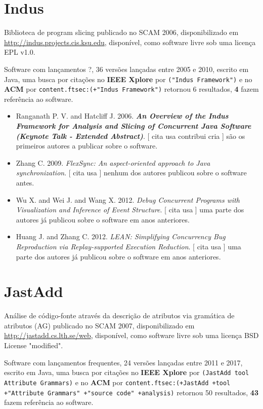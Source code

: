 \section{Indus}

Biblioteca de program slicing
publicado no SCAM 2006,
disponibilizado em \url{http://indus.projects.cis.ksu.edu},
disponível,
como software livre
sob uma licença EPL v1.0.

Software com lançamentos ?,
36 versões lançadas
entre 2005 e 2010,
escrito em Java,
uma busca por citações no {\bf IEEE Xplore} por
\texttt{("Indus Framework")}
e no {\bf ACM} por
\texttt{content.ftsec:(+"Indus Framework")}
retornou
6 resultados,
{\bf 4} fazem referência ao software.

\begin{itemize}
\item Ranganath P. V. and Hatcliff J.
      2006.
        \textbf{\textit{ An Overview of the Indus Framework for Analysis and Slicing of Concurrent Java Software (Keynote Talk - Extended Abstract)}}.
      [
          cita
          usa
          contribui
          cria
      ]
são os primeiros autores a publicar sobre o software.
\item Zhang C.
      2009.
        \textit{ FlexSync: An aspect-oriented approach to Java synchronization}.
      [
          cita
          usa
      ]
nenhum dos autores publicou sobre o software antes.
\item Wu X. and Wei J. and Wang X.
      2012.
        \textit{ Debug Concurrent Programs with Visualization and Inference of Event Structure}.
      [
          cita
          usa
      ]
uma parte dos autores já publicou sobre o software em anos anteriores.
\item Huang J. and Zhang C.
      2012.
        \textit{ LEAN: Simplifying Concurrency Bug Reproduction via Replay-supported Execution Reduction}.
      [
          cita
          usa
      ]
uma parte dos autores já publicou sobre o software em anos anteriores.
\end{itemize}
\section{JastAdd}

Análise de código-fonte através da descrição de atributos via gramática de atributos (AG)
publicado no SCAM 2007,
disponibilizado em \url{http://jastadd.cs.lth.se/web},
disponível,
como software livre
sob uma licença BSD License "modified".

Software com lançamentos frequentes,
24 versões lançadas
entre 2011 e 2017,
escrito em Java,
uma busca por citações no {\bf IEEE Xplore} por
\texttt{(JastAdd tool Attribute Grammars)}
e no {\bf ACM} por
\texttt{content.ftsec:(+JastAdd +tool +"Attribute Grammars" +"source code" +analysis)}
retornou
50 resultados,
{\bf 43} fazem referência ao software.

